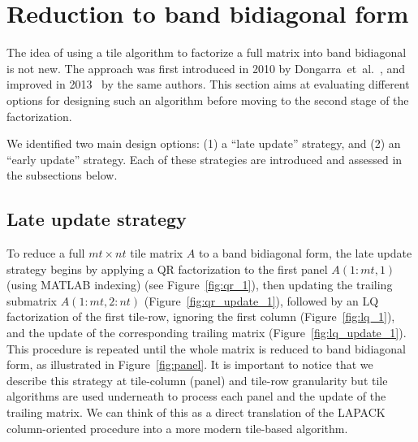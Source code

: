 \section{Reduction  to band bidiagonal form}
\label{sec:band}
The idea of using a tile algorithm to factorize a full matrix into
band bidiagonal is not new.
The approach was first introduced in 2010 by
Dongarra~et~al\@.~\cite{ltaief2010parallel},
and improved in 2013~\cite{haidar2013improved}
by the same authors.
This section aims at evaluating different options for
designing such an algorithm
before moving to the second stage of the factorization.

We identified two main design options:
(1) a ``late update'' strategy, and
(2) an ``early update'' strategy.
Each of these strategies are introduced
and assessed in the subsections below.

\subsection{Late update strategy}
To reduce a full $mt \times nt$ tile matrix $A$ to a band bidiagonal
form, the late update strategy begins by applying a QR
factorization to the first panel $A(1:mt,1)$ (using MATLAB indexing)
(see Figure~\ref{fig:qr_1}), then updating the trailing
submatrix $A(1:mt,2:nt)$ (Figure~\ref{fig:qr_update_1}), followed
by an LQ factorization of the first tile-row,
ignoring the first column (Figure~\ref{fig:lq_1}),
and the update of the corresponding trailing matrix
(Figure~\ref{fig:lq_update_1}).
This procedure is repeated until the whole matrix is reduced to
band bidiagonal form, as illustrated in Figure~\ref{fig:panel}.
It is important to notice that we describe this strategy
at tile-column (panel) and tile-row granularity but
tile algorithms are used underneath to process each panel
and the update of the trailing matrix.
We can think of this as a direct translation of the LAPACK
column-oriented procedure into a
more modern tile-based algorithm.

